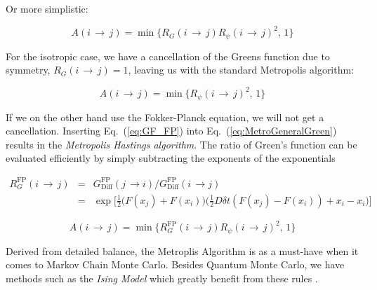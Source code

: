 
Or more simplistic:

\begin{equation}
  A(i\,\rightarrow\,j) = \min\{R_G(i\,\rightarrow\,j)R_\psi(i\,\rightarrow\,j)^2, \,1\}
\end{equation}


For the isotropic case, we have a cancellation of the Greens function due to symmetry, $R_G(i\,\rightarrow\,j) = 1$, leaving us with the standard Metropolis algorithm:

\begin{equation}
\label{eq:Metropolis_standard}
 A(i\,\rightarrow\,j) = \min\{R_\psi(i\,\rightarrow\,j)^2, \,1\}
\end{equation}

If we on the other hand use the Fokker-Planck equation, we will not get a cancellation. Inserting Eq.~(\ref{eq:GF_FP}) into Eq.~(\ref{eq:MetroGeneralGreen}) results in the \textit{Metropolis Hastings algorithm}. The ratio of Green's function can be evaluated efficiently by simply subtracting the exponents of the exponentials

\begin{eqnarray}
 R_G^\mathrm{FP}(i\,\rightarrow\,j) &=&G_\mathrm{Diff}^\mathrm{FP}(j\,\rightarrow i)/G_\mathrm{Diff}^\mathrm{FP}(i\,\rightarrow j) \nonumber \\
                                    &=& \exp{\Big[\frac{1}{2}\big(F(x_j) + F(x_i)\big)\big(\frac{1}{2}D\delta t(F(x_j) - F(x_i)) + x_i - x_i\big)\Big]}
\end{eqnarray}

\begin{equation}
\label{eq:MetropolisHastings}
 A(i\,\rightarrow\,j) = \min\{R_G^\mathrm{FP}(i\,\rightarrow\,j)R_\psi(i\,\rightarrow\,j)^2, \,1\}
\end{equation}

Derived from detailed balance, the Metroplis Algorithm is as a must-have when it comes to Markov Chain Monte Carlo. Besides Quantum Monte Carlo, we have methods such as the \textit{Ising Model} which greatly benefit from these rules \cite{morten}.

